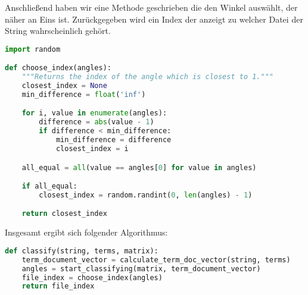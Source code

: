 \documentclass{article}
\begin{document}
\noindent Anschließend haben wir eine Methode geschrieben die den Winkel auswählt, der näher an Eins ist. Zurückgegeben wird ein Index der anzeigt zu welcher Datei der String wahrscheinlich gehört.
\begin{center}
\begin{minipage}{0.8\linewidth}
\begin{lstlisting}[language=Python]
import random

def choose_index(angles):
    """Returns the index of the angle which is closest to 1."""
    closest_index = None
    min_difference = float('inf')

    for i, value in enumerate(angles):
        difference = abs(value - 1)
        if difference < min_difference:
            min_difference = difference
            closest_index = i

    all_equal = all(value == angles[0] for value in angles)

    if all_equal:
        closest_index = random.randint(0, len(angles) - 1)

    return closest_index
\end{lstlisting}
\end{minipage}
\end{center}
Insgesamt ergibt sich folgender Algorithmus:
\begin{center}
\begin{minipage}{0.8\linewidth}
\begin{lstlisting}[language=Python]
def classify(string, terms, matrix):
    term_document_vector = calculate_term_doc_vector(string, terms)
    angles = start_classifying(matrix, term_document_vector)
    file_index = choose_index(angles)
    return file_index
\end{lstlisting}
\end{minipage}
\end{center}
\newpage
\end{document}
